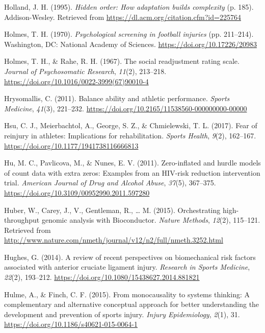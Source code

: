 \documentclass[
  english,
  man,floatsintext]{apa6}
\begin{document}
\leavevmode\hypertarget{ref-Holland1995}{}%
Holland, J. H. (1995). \emph{Hidden order: How adaptation builds complexity} (p. 185). Addison-Wesley. Retrieved from \url{https://dl.acm.org/citation.cfm?id=225764}

\leavevmode\hypertarget{ref-Holmes1970}{}%
Holmes, T. H. (1970). \emph{Psychological screening in football injuries} (pp. 211--214). Washington, DC: National Academy of Sciences. \url{https://doi.org/10.17226/20983}

\leavevmode\hypertarget{ref-Holmes1967}{}%
Holmes, T. H., \& Rahe, R. H. (1967). The social readjustment rating scale. \emph{Journal of Psychosomatic Research}, \emph{11}(2), 213--218. \url{https://doi.org/10.1016/0022-3999(67)90010-4}

\leavevmode\hypertarget{ref-Hrysomallis2011}{}%
Hrysomallis, C. (2011). Balance ability and athletic performance. \emph{Sports Medicine}, \emph{41}(3), 221--232. \url{https://doi.org/10.2165/11538560-000000000-00000}

\leavevmode\hypertarget{ref-Hsu2017}{}%
Hsu, C. J., Meierbachtol, A., George, S. Z., \& Chmielewski, T. L. (2017). Fear of reinjury in athletes: Implications for rehabilitation. \emph{Sports Health}, \emph{9}(2), 162--167. \url{https://doi.org/10.1177/1941738116666813}

\leavevmode\hypertarget{ref-Hu2011}{}%
Hu, M. C., Pavlicova, M., \& Nunes, E. V. (2011). Zero-inflated and hurdle models of count data with extra zeros: Examples from an HIV-risk reduction intervention trial. \emph{American Journal of Drug and Alcohol Abuse}, \emph{37}(5), 367--375. \url{https://doi.org/10.3109/00952990.2011.597280}

\leavevmode\hypertarget{ref-R-BiocGenerics}{}%
Huber, W., Carey, J., V., Gentleman, R., \ldots{} M. (2015). Orchestrating high-throughput genomic analysis with Bioconductor. \emph{Nature Methods}, \emph{12}(2), 115--121. Retrieved from \url{http://www.nature.com/nmeth/journal/v12/n2/full/nmeth.3252.html}

\leavevmode\hypertarget{ref-Hughes2014}{}%
Hughes, G. (2014). A review of recent perspectives on biomechanical risk factors associated with anterior cruciate ligament injury. \emph{Research in Sports Medicine}, \emph{22}(2), 193--212. \url{https://doi.org/10.1080/15438627.2014.881821}

\leavevmode\hypertarget{ref-Hulme2015}{}%
Hulme, A., \& Finch, C. F. (2015). From monocausality to systems thinking: A complementary and alternative conceptual approach for better understanding the development and prevention of sports injury. \emph{Injury Epidemiology}, \emph{2}(1), 31. \url{https://doi.org/10.1186/s40621-015-0064-1}
\end{document}
